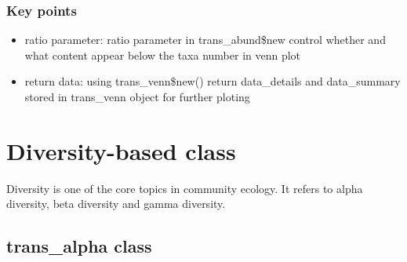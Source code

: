 \documentclass[
]{book}
\newenvironment{Shaded}{\begin{snugshade}}{\end{snugshade}}
\newcommand{\AttributeTok}[1]{\textcolor[rgb]{0.77,0.63,0.00}{#1}}
\newcommand{\CommentTok}[1]{\textcolor[rgb]{0.56,0.35,0.01}{\textit{#1}}}
\newcommand{\ConstantTok}[1]{\textcolor[rgb]{0.00,0.00,0.00}{#1}}
\newcommand{\FunctionTok}[1]{\textcolor[rgb]{0.00,0.00,0.00}{#1}}
\newcommand{\NormalTok}[1]{#1}
\newcommand{\OtherTok}[1]{\textcolor[rgb]{0.56,0.35,0.01}{#1}}
\newcommand{\SpecialCharTok}[1]{\textcolor[rgb]{0.00,0.00,0.00}{#1}}
\newcommand{\StringTok}[1]{\textcolor[rgb]{0.31,0.60,0.02}{#1}}
\providecommand{\tightlist}{%
  \setlength{\itemsep}{0pt}\setlength{\parskip}{0pt}}
\begin{document}
\begin{Shaded}
\end{Shaded}

\hypertarget{key-points-2}{%
\subsection{Key points}\label{key-points-2}}

\begin{itemize}
\tightlist
\item
  ratio parameter: ratio parameter in trans\_abund\$new control whether and what content appear below the taxa number in venn plot
\item
  return data: using trans\_venn\$new() return data\_details and data\_summary stored in trans\_venn object for further ploting
\end{itemize}

\hypertarget{diversity-based-class}{%
\chapter{Diversity-based class}\label{diversity-based-class}}

Diversity is one of the core topics in community ecology.
It refers to alpha diversity, beta diversity and gamma diversity.

\hypertarget{trans_alpha-class}{%
\section{trans\_alpha class}\label{trans_alpha-class}}
\end{document}
